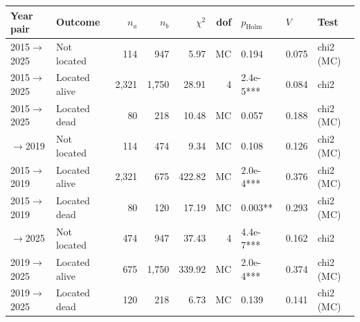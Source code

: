 \begin{tabular}{llrrrrlll}
\toprule
Year pair & Outcome & $n_a$ & $n_b$ & $\chi^2$ & dof & $p_\mathrm{Holm}$ & $V$ & Test \\
\midrule
2015$\to$2025 & Not located & 114 & 947 & 5.97 & MC & 0.194 & 0.075 & chi2 (MC) \\
2015$\to$2025 & Located alive & 2,321 & 1,750 & 28.91 & 4 & 2.4e-5*** & 0.084 & chi2 \\
2015$\to$2025 & Located dead & 80 & 218 & 10.48 & MC & 0.057 & 0.188 & chi2 (MC) \\
\addlinespace
2015$\to$2019 & Not located & 114 & 474 & 9.34 & MC & 0.108 & 0.126 & chi2 (MC) \\
2015$\to$2019 & Located alive & 2,321 & 675 & 422.82 & MC & 2.0e-4*** & 0.376 & chi2 (MC) \\
2015$\to$2019 & Located dead & 80 & 120 & 17.19 & MC & 0.003** & 0.293 & chi2 (MC) \\
\addlinespace
2019$\to$2025 & Not located & 474 & 947 & 37.43 & 4 & 4.4e-7*** & 0.162 & chi2 \\
2019$\to$2025 & Located alive & 675 & 1,750 & 339.92 & MC & 2.0e-4*** & 0.374 & chi2 (MC) \\
2019$\to$2025 & Located dead & 120 & 218 & 6.73 & MC & 0.139 & 0.141 & chi2 (MC) \\
\bottomrule
\end{tabular}
%
